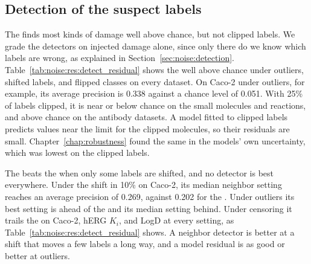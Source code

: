 \subsection{Detection of the suspect labels}\label{sec:noise:res:detectors}

The  finds most kinds of damage well above chance, but not clipped labels. We grade the detectors on injected damage alone, since only there do we know which labels are wrong, as explained in Section~\ref{sec:noise:detection}. Table~\ref{tab:noise:res:detect_residual} shows the  well above chance under outliers, shifted labels, and flipped classes on every dataset. On Caco-2 under outliers, for example, its average precision is 0.338 against a chance level of 0.051. With 25\% of labels clipped, it is near or below chance on the small molecules and reactions, and above chance on the antibody datasets. A model fitted to clipped labels predicts values near the limit for the clipped molecules, so their residuals are small. Chapter~\ref{chap:robustness} found the same in the models' own uncertainty, which was lowest on the clipped labels.

The  beats the  when only some labels are shifted, and no detector is best everywhere. Under the shift in 10\% on Caco-2, its median neighbor setting reaches an average precision of 0.269, against 0.202 for the . Under outliers its best setting is ahead of the  and its median setting behind. Under censoring it trails the  on Caco-2, hERG $K_i$, and LogD at every setting, as Table~\ref{tab:noise:res:detect_residual} shows. A neighbor detector is better at a shift that moves a few labels a long way, and a model residual is as good or better at outliers.

